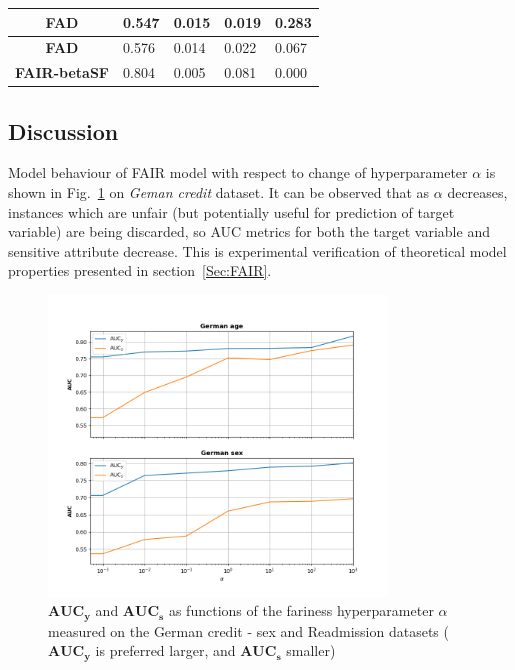 \documentclass[preprint,12pt]{elsarticle}
\begin{document}
\begin{table}
\begin{tabular}{|c|l|l|l|l|}
		\textbf{FAD}           & 0.547                             & 0.015                             & 0.019                             & 0.283                              \\ \hline
		\textbf{FAD}           & 0.576                             & 0.014                             & 0.022                             & 0.067                              \\ \hline
		\textbf{FAIR-betaSF}   & 0.804                             & 0.005                             & 0.081                             & 0.000                              \\ \hline
	\end{tabular}
	\label{tab:Ger-sex}%
\end{table}

\subsection{Discussion}

Model behaviour of FAIR model with respect to change of hyperparameter $\alpha$ is shown in Fig.~\ref{fig:FigResultsAlpha} on \textit{Geman credit} dataset. It can be observed that as $\alpha$ decreases, instances which are unfair (but potentially useful for prediction of target variable) are being discarded, so AUC metrics for both the target variable and sensitive attribute decrease. This is experimental verification of theoretical model properties presented in section~\ref{Sec:FAIR}.

\begin{figure}[h]
	\center
	\includegraphics[angle=0, width=0.8\textwidth]{AUC_y_A.png}
	\captionsetup{justification=centering}
	\caption{$\mathbf{AUC_y}$ and $\mathbf{AUC_s}$ as functions of the fariness hyperparameter $\alpha$ measured on the  German credit - sex and Readmission datasets ($\mathbf{AUC_y}$ is preferred larger, and $\mathbf{AUC_s}$ smaller)}
	\label{fig:FigResultsAlpha}
\end{figure}
\end{document}
